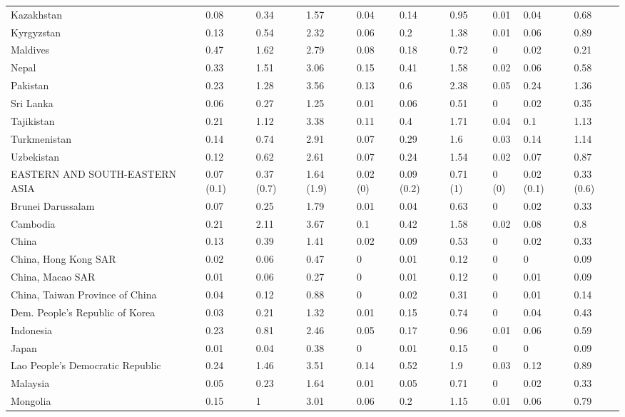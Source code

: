 \begin{longtable}[t]{llllllllll}
Kazakhstan & 0.08 & 0.34 & 1.57 & 0.04 & 0.14 & 0.95 & 0.01 & 0.04 & 0.68\\
Kyrgyzstan & 0.13 & 0.54 & 2.32 & 0.06 & 0.2 & 1.38 & 0.01 & 0.06 & 0.89\\
Maldives & 0.47 & 1.62 & 2.79 & 0.08 & 0.18 & 0.72 & 0 & 0.02 & 0.21\\
Nepal & 0.33 & 1.51 & 3.06 & 0.15 & 0.41 & 1.58 & 0.02 & 0.06 & 0.58\\
Pakistan & 0.23 & 1.28 & 3.56 & 0.13 & 0.6 & 2.38 & 0.05 & 0.24 & 1.36\\
Sri Lanka & 0.06 & 0.27 & 1.25 & 0.01 & 0.06 & 0.51 & 0 & 0.02 & 0.35\\
Tajikistan & 0.21 & 1.12 & 3.38 & 0.11 & 0.4 & 1.71 & 0.04 & 0.1 & 1.13\\
Turkmenistan & 0.14 & 0.74 & 2.91 & 0.07 & 0.29 & 1.6 & 0.03 & 0.14 & 1.14\\
Uzbekistan & 0.12 & 0.62 & 2.61 & 0.07 & 0.24 & 1.54 & 0.02 & 0.07 & 0.87\\
EASTERN AND SOUTH-EASTERN ASIA & 0.07 (0.1) & 0.37 (0.7) & 1.64 (1.9) & 0.02 (0) & 0.09 (0.2) & 0.71 (1) & 0 (0) & 0.02 (0.1) & 0.33 (0.6)\\
Brunei Darussalam & 0.07 & 0.25 & 1.79 & 0.01 & 0.04 & 0.63 & 0 & 0.02 & 0.33\\
Cambodia & 0.21 & 2.11 & 3.67 & 0.1 & 0.42 & 1.58 & 0.02 & 0.08 & 0.8\\
China & 0.13 & 0.39 & 1.41 & 0.02 & 0.09 & 0.53 & 0 & 0.02 & 0.33\\
China, Hong Kong SAR & 0.02 & 0.06 & 0.47 & 0 & 0.01 & 0.12 & 0 & 0 & 0.09\\
China, Macao SAR & 0.01 & 0.06 & 0.27 & 0 & 0.01 & 0.12 & 0 & 0.01 & 0.09\\
China, Taiwan Province of China & 0.04 & 0.12 & 0.88 & 0 & 0.02 & 0.31 & 0 & 0.01 & 0.14\\
Dem. People's Republic of Korea & 0.03 & 0.21 & 1.32 & 0.01 & 0.15 & 0.74 & 0 & 0.04 & 0.43\\
Indonesia & 0.23 & 0.81 & 2.46 & 0.05 & 0.17 & 0.96 & 0.01 & 0.06 & 0.59\\
Japan & 0.01 & 0.04 & 0.38 & 0 & 0.01 & 0.15 & 0 & 0 & 0.09\\
Lao People's Democratic Republic & 0.24 & 1.46 & 3.51 & 0.14 & 0.52 & 1.9 & 0.03 & 0.12 & 0.89\\
Malaysia & 0.05 & 0.23 & 1.64 & 0.01 & 0.05 & 0.71 & 0 & 0.02 & 0.33\\
Mongolia & 0.15 & 1 & 3.01 & 0.06 & 0.2 & 1.15 & 0.01 & 0.06 & 0.79\\

\end{longtable}
